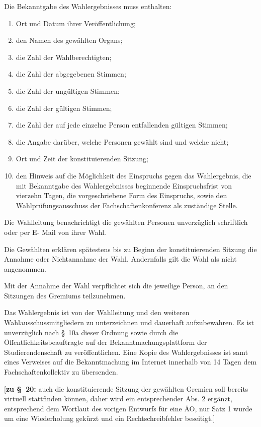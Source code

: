\documentclass[%
draft,%
multilinesections%
]{fswo}
\newcommand\bemFr[1] {{\color{Red}[#1]}}
\newcommand\bemFr[1]{}%
\begin{document}
\begin{contract}
Die Bekanntgabe des Wahlergebnisses muss enthalten:
\begin{enumerate}
\item Ort und Datum ihrer Veröffentlichung;
\item den Namen des gewählten Organs;
\item die Zahl der Wahlberechtigten;
\item die Zahl der abgegebenen Stimmen;
\item die Zahl der ungültigen Stimmen;
\item die Zahl der gültigen Stimmen;
\item die Zahl der auf jede einzelne Person entfallenden gültigen Stimmen;
\item die Angabe darüber, welche Personen gewählt sind und welche nicht;
\item Ort und Zeit der konstituierenden Sitzung;
\item den Hinweis auf die Möglichkeit des Einspruchs gegen das Wahlergebnis, die mit Bekanntgabe des Wahlergebnisses beginnende Einspruchsfrist von vierzehn Tagen, die vorgeschriebene Form des Einspruchs, sowie den Wahlprüfungsausschuss der Fachschaftenkonferenz als zuständige Stelle.
\end{enumerate}

Die Wahlleitung benachrichtigt die gewählten Personen unverzüglich schriftlich oder per E- Mail von ihrer Wahl.

Die Gewählten erklären spätestens bis zu Beginn der konstituierenden Sitzung die Annahme oder Nichtannahme der Wahl. Andernfalls gilt die Wahl als nicht angenommen.

Mit der Annahme der Wahl verpflichtet sich die jeweilige Person, an den Sitzungen des Gremiums teilzunehmen.

Das Wahlergebnis ist von der Wahlleitung und den weiteren Wahlausschussmitgliedern zu unterzeichnen und dauerhaft aufzubewahren.
Es ist unverzüglich nach \S~10a dieser Ordnung sowie durch die Öffentlichkeitsbeauftragte auf der Bekanntmachungsplattform der Studierendenschaft zu veröffentlichen.
Eine Kopie des Wahlergebnisses ist samt eines Verweises auf die Bekanntmachung im Internet innerhalb von 14 Tagen dem Fachschaftenkollektiv zu übersenden.
\end{contract}

\bemFr{\textbf{zu \S~20:}
auch die konstituierende Sitzung der gewählten Gremien soll bereits virtuell stattfinden können, daher wird ein entsprechender Abs. 2 ergänzt, entsprechend dem Wortlaut des vorigen Entwurfs für eine ÄO, nur Satz 1 wurde um eine Wiederholung gekürzt und ein Rechtschreibfehler beseitigt.}
\end{document}
